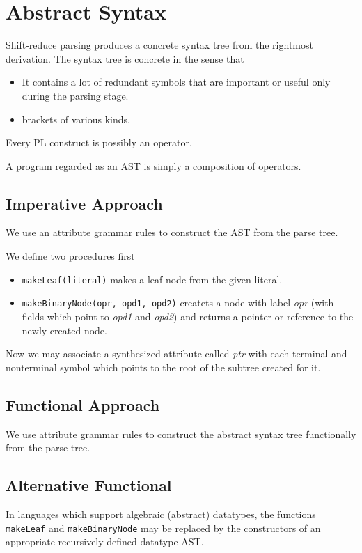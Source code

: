 \documentclass[a4paper]{scrartcl}
\theoremstyle{definition}
\begin{document}
\section{Abstract Syntax}
Shift-reduce parsing produces a concrete syntax tree from the rightmost derivation. The syntax tree is concrete in the sense that
\begin{itemize}
	\item It contains a lot of redundant symbols that are important or useful only during the parsing stage.
	\item brackets of various kinds.
\end{itemize}

Every PL construct is possibly an operator.

A program regarded as an AST is simply a composition of operators.

\subsection{Imperative Approach}
We use an attribute grammar rules to construct the AST from the parse tree.

We define two procedures first
\begin{itemize}
	\item \texttt{makeLeaf(literal)} makes a leaf node from the given literal.
	\item \texttt{makeBinaryNode(opr, opd1, opd2)} createts a node with label \emph{opr} (with fields which point to \emph{opd1} and \emph{opd2}) and returns a pointer or reference to the newly created node.
\end{itemize}
Now we may associate a synthesized attribute called \emph{ptr} with each terminal and nonterminal symbol which points to the root of the subtree created for it.

\subsection{Functional Approach}
We use attribute grammar rules to construct the abstract syntax tree functionally from the parse tree.

\subsection{Alternative Functional}
In languages which support algebraic (abstract) datatypes, the functions \texttt{makeLeaf} and \texttt{makeBinaryNode} may be replaced by the constructors of an appropriate recursively defined datatype AST.
\end{document}
